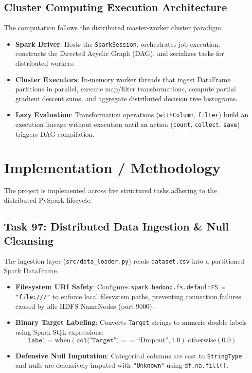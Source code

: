 \documentclass[11pt,a4paper]{article}
\begin{document}
\subsection{Cluster Computing Execution Architecture}
The computation follows the distributed master-worker cluster paradigm:
\begin{itemize}
    \item \textbf{Spark Driver}: Hosts the \texttt{SparkSession}, orchestrates job execution, constructs the Directed Acyclic Graph (DAG), and serializes tasks for distributed workers.
    \item \textbf{Cluster Executors}: In-memory worker threads that ingest DataFrame partitions in parallel, execute map/filter transformations, compute partial gradient descent sums, and aggregate distributed decision tree histograms.
    \item \textbf{Lazy Evaluation}: Transformation operations (\texttt{withColumn}, \texttt{filter}) build an execution lineage without execution until an action (\texttt{count}, \texttt{collect}, \texttt{save}) triggers DAG compilation.
\end{itemize}

\section{Implementation / Methodology}
\label{sec:methodology}

The project is implemented across five structured tasks adhering to the distributed PySpark lifecycle.

\subsection{Task 97: Distributed Data Ingestion \& Null Cleansing}
The ingestion layer (\texttt{src/data\_loader.py}) reads \texttt{dataset.csv} into a partitioned Spark DataFrame. 
\begin{itemize}
    \item \textbf{Filesystem URI Safety}: Configures \texttt{spark.hadoop.fs.defaultFS = "file:///"} to enforce local filesystem paths, preventing connection failures caused by idle HDFS NameNodes (port 9000).
    \item \textbf{Binary Target Labeling}: Converts \texttt{Target} strings to numeric double labels using Spark SQL expressions:
    \begin{equation}
        \texttt{label} = \text{when}(\texttt{col("Target")} == \text{``Dropout''}, 1.0).\text{otherwise}(0.0)
    \end{equation}
    \item \textbf{Defensive Null Imputation}: Categorical columns are cast to \texttt{StringType} and nulls are defensively imputed with \texttt{"Unknown"} using \texttt{df.na.fill()}.
\end{itemize}
\end{document}
